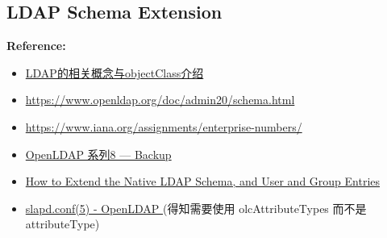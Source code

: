 \documentclass[12pt]{article}
\newenvironment{mycolorbox}[1][gray]{
  \renewmdenv[
    linewidth=2pt, linecolor=#1, backgroundcolor=#1!10,
    topline=false, bottomline=false, rightline=false,
    skipabove=10pt, skipbelow=10pt, innerleftmargin=10pt,
    innerrightmargin=0pt, innertopmargin=5pt, innerbottommargin=5pt
  ]{myquote}
  \begin{myquote}
}{\end{myquote}}
\begin{document}
\subsection{LDAP Schema Extension}
\begin{mycolorbox}[teal]
  \textbf{Reference:}
  \footnotesize
  \begin{itemize}
    \item \href{https://blog.csdn.net/liukuan73/article/details/78684710}{LDAP的相关概念与objectClass介绍}
    \item \url{https://www.openldap.org/doc/admin20/schema.html}
    \item \url{https://www.iana.org/assignments/enterprise-numbers/}
    \item \href{https://www.cnblogs.com/eagle6688/p/16996460.html}{OpenLDAP 系列8 --- Backup}
    \item \href{https://docs.oracle.com/cd/E19120-01/open.solaris/820-2429/modifynldapdirbasedmapping/index.html}{How to Extend the Native LDAP Schema, and User and Group Entries}
    \item \href{https://www.openldap.org/doc/admin26/slapdconf2.html}{slapd.conf(5) - OpenLDAP }(得知需要使用 olcAttributeTypes 而不是 attributeType)
  \end{itemize}
\end{mycolorbox}
\end{document}

